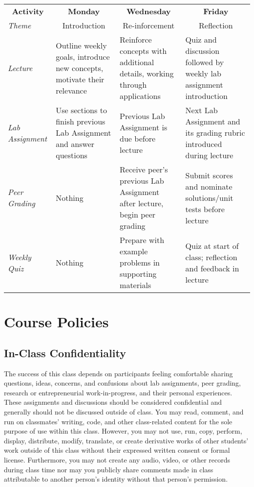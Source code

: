 \documentclass[10pt]{memoir}
\begin{document}
\begin{table}[h]
    \scriptsize
    \centering
    \begin{tabular}{ p{1.7cm} p{3.9cm} p{3.9cm} p{3.9cm} }
        \toprule[.15em]
        \multicolumn{1}{c}{\textbf{Activity}} & \multicolumn{1}{c}{\textbf{Monday}} & \multicolumn{1}{c}{\textbf{Wednesday}} & \multicolumn{1}{c}{\textbf{Friday}} \\
        \cmidrule[.1em](lr){1-4}
        \textit{Theme} & \multicolumn{1}{c}{Introduction} & \multicolumn{1}{c}{Re-inforcement} & \multicolumn{1}{c}{Reflection} \\
        \cmidrule[.1em](lr){1-4}
        \textit{Lecture} & Outline weekly goals, introduce new concepts, motivate their relevance & Reinforce concepts with additional details, working through applications & Quiz and discussion followed by weekly lab assignment introduction \\ 
        \cmidrule[.1em](lr){1-4}
        \textit{Lab Assignment} & Use sections to finish previous Lab Assignment and answer questions & Previous Lab Assignment is due before lecture & Next Lab Assignment and its grading rubric introduced during lecture \\ 
        \cmidrule[.1em](lr){1-4}
        \textit{Peer Grading} & Nothing & Receive peer's previous Lab Assignment after lecture, begin peer grading & Submit scores and nominate solutions/unit tests before lecture \\ 
        \cmidrule[.1em](lr){1-4}
        \textit{Weekly Quiz} & Nothing & Prepare with example problems in supporting materials & Quiz at start of class; reflection and feedback in lecture \\
        \bottomrule[.15em]
    \end{tabular}
\end{table}


\section{Course Policies}

\subsection{In-Class Confidentiality}
The success of this class depends on participants feeling comfortable sharing questions, ideas, concerns, and confusions about lab assignments, peer grading, research or entrepreneurial work-in-progress, and their personal experiences. These assignments and discussions should be considered confidential and generally should not be discussed outside of class. You may read, comment, and run on classmates' writing, code, and other class-related content for the sole purpose of use within this class. However, you may not use, run, copy, perform, display, distribute, modify, translate, or create derivative works of other students' work outside of this class without their expressed written consent or formal license. Furthermore, you may not create any audio, video, or other records during class time nor may you publicly share comments made in class attributable to another person's identity without that person's permission.
\end{document}
